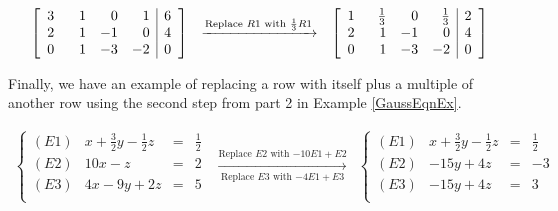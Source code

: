 \documentclass{ximera}
\begin{document}
\[\begin{array}{ccc}

\left[ \begin{array}{rrrr|r} 
3 & \hphantom{-} 1 & 0 & 1 & 6  \\
2 & 1 & -1 & 0 & 4 \\ 
0 & 1 & -3 & -2 & 0 \\ 

\end{array} \right]

&
\xrightarrow{\text{Replace $R1$ with $\frac{1}{3}R1$}}

&

\left[ \begin{array}{rrrr|r} 
1 & \frac{1}{3} & 0 & \frac{1}{3} & 2  \\
2 & \hphantom{-}1 & -1 & 0 & 4 \\ 
0 & 1 & -3 & -2 & 0 \\ 

\end{array} \right]
\end{array}\]

Finally, we have an example of replacing a row with itself plus a multiple of another row using the second step from part 2 in Example \ref{GaussEqnEx}.

\[ \begin{array}{ccc}

\left\{ 

\begin{array}{lrcr}

(E1) & x+\frac{3}{2}y-\frac{1}{2}z & = & \frac{1}{2} \\ 
(E2) & 10x-z & = & 2 \\
(E3) &  4x-9y+2z & = & 5 \\

\end{array} 

\right.
&
\xrightarrow[\text{Replace $E3$ with $-4E1 + E3$}]{\text{Replace $E2$ with $-10E1 + E2$}}

&

\left\{ 

\begin{array}{lrcr}

(E1) & x+\frac{3}{2}y-\frac{1}{2}z & = & \frac{1}{2} \\ 
(E2) & -15y+4z & = & -3 \\
(E3) & -15y+4z & = & 3 \\

\end{array} 

\right.
 \end{array} \]
 
\end{document}
